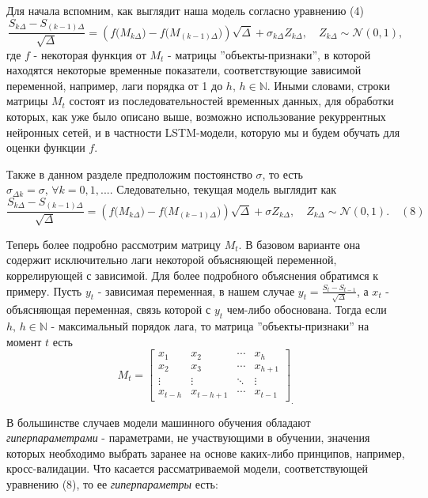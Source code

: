 Для начала вспомним, как выглядит наша модель согласно уравнению (4)
\[
\frac{ S_{k \Delta} - S_{(k - 1) \Delta}}{\sqrt{\Delta}} = \left( f \big( M_{k \Delta} \big) - f \big( M_{(k - 1) \Delta} \big) \right) \sqrt{\Delta} +  \sigma_{k \Delta} Z_{k \Delta}, \quad Z_{k \Delta} \sim \mathcal{N}(0, 1),
\]
где $f$ - некоторая функция от $M_t$ - матрицы ''объекты-признаки'', в которой находятся некоторые временные показатели, соответствующие зависимой переменной, например, лаги порядка от 1 до $h, \, h \in \mathbb N$. Иными словами, строки матрицы $M_t$ состоят из последовательностей временных данных, для обработки которых, как уже было описано выше, возможно использование рекуррентных нейронных сетей, и в частности LSTM-модели, которую мы и будем обучать для оценки функции $f$.

Также в данном разделе предположим постоянство $\sigma$, то есть $\sigma_{\Delta k} = \sigma, \, \forall k = 0, 1, ... $. Следовательно, текущая модель выглядит как
\[
\frac{ S_{k \Delta} - S_{(k - 1) \Delta}}{\sqrt{\Delta}} = \left( f \big( M_{k \Delta} \big) - f \big( M_{(k - 1) \Delta} \big) \right) \sqrt{\Delta} +  \sigma Z_{k \Delta}, \quad Z_{k \Delta} \sim \mathcal{N}(0, 1). \quad (8)
\]

Теперь более подробно рассмотрим матрицу $M_t$. В базовом варианте она содержит исключительно лаги некоторой объясняющей переменной, коррелирующей с зависимой. Для более подробного объяснения обратимся к примеру. Пусть $y_t$ - зависимая переменная, в нашем случае $y_t = \frac{S_t - S_{t - 1}}{\sqrt{\Delta}}$, а $x_t$ - объясняющая переменная, связь которой с $y_t$ чем-либо обоснована. Тогда если $h, \, h \in \mathbb N$ - максимальный порядок лага, то матрица ''объекты-признаки'' на момент $t$ есть
\[
M_t = \begin{bmatrix}
    x_{1} & x_{2} & \cdots & x_{h} \\
    x_{2} & x_{3} & \cdots & x_{h + 1} \\
    \vdots & \vdots & \ddots & \vdots \\
    x_{t - h} & x_{t - h + 1} & \cdots & x_{t - 1} 
\end{bmatrix}_.
\]

В большинстве случаев модели машинного обучения обладают \textit{гиперпараметрами} - параметрами, не участвующими в обучении, значения которых необходимо выбрать заранее на основе каких-либо принципов, например, кросс-валидации. Что касается рассматриваемой модели, соответствующей уравнению (8), то ее \textit{гиперпараметры} есть:

\vspace{-20pt}

